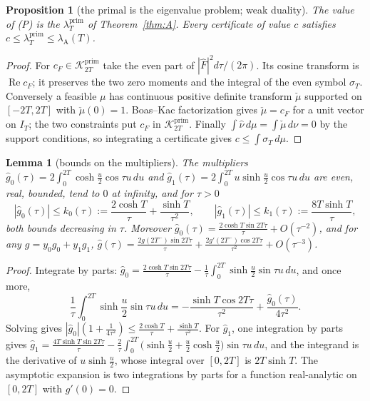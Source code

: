 \documentclass[10pt]{amsart}
\newtheorem{proposition}[theorem]{Proposition}
\newtheorem{lemma}[theorem]{Lemma}
\theoremstyle{definition}
\theoremstyle{remark}
\newcommand{\Rel}{\operatorname{Re}}
\newcommand{\Kp}{\mathcal K^{\mathrm{prim}}_{2T}}
\newcommand{\IT}{I_T}
\newcommand{\lamP}{\lambda^{\mathrm{prim}}_T}
\newcommand{\lamA}{\lambda_{\mathrm A}(T)}
\newcommand{\sT}{\sigma_T}
\newcommand{\gh}[1]{\widehat g_{#1}}
\newcommand{\nuh}{\widehat\nu}
\newcommand{\Fh}{\widehat F}
\newcommand{\cF}{c_F}
\begin{document}
\begin{proposition}[the primal is the eigenvalue problem; weak duality]\label{prop:weak}
The value of \textup{(P)} is the $\lamP$ of Theorem~\ref{thm:A}. Every certificate of value $c$
satisfies $c\le\lamP\le\lamA$.
\end{proposition}
\begin{proof}
For $\cF\in\Kp$ take the even part of $|\Fh|^2d\tau/(2\pi)$.
Its cosine transform is $\Rel\cF$; it preserves the two zero moments
and the integral of the even symbol $\sT$. Conversely a feasible
$\mu$ has continuous positive definite transform $\check\mu$ supported
on $[-2T,2T]$ with $\check\mu(0)=1$. Boas--Kac factorization
\cite{BoasKac1945} gives $\check\mu=\cF$ for a unit vector on $\IT$;
the two constraints put $\cF$ in $\Kp$. Finally
$\int\nuh\,d\mu=\int\check\mu\,d\nu=0$ by the support conditions,
so integrating a certificate gives $c\le\int\sT\,d\mu$.
\end{proof}

\begin{lemma}[bounds on the multipliers]\label{lem:gbounds}
The multipliers $\gh0(\tau)=2\int_0^{2T}\cosh\frac u2\cos\tau u\,du$ and $\gh1(\tau)=2\int_0^{2T}u\sinh\frac u2\cos\tau u\,du$
are even, real, bounded, tend to $0$ at infinity, and for $\tau>0$
\[
|\gh0(\tau)|\le k_0(\tau):=\frac{2\cosh T}{\tau}+\frac{\sinh T}{\tau^2},\qquad
|\gh1(\tau)|\le k_1(\tau):=\frac{8T\sinh T}{\tau},
\]
both bounds decreasing in $\tau$. Moreover $\gh0(\tau)=\frac{2\cosh T\sin2T\tau}{\tau}+O(\tau^{-2})$,
and for any $g=y_0g_0+y_1g_1$, $\widehat g(\tau)=\frac{2g(2T^-)\sin2T\tau}{\tau}+\frac{2g'(2T^-)\cos2T\tau}{\tau^2}+O(\tau^{-3})$.
\end{lemma}
\begin{proof}
Integrate by parts: $\gh0=\frac{2\cosh T\sin2T\tau}\tau-\frac1\tau\int_0^{2T}\sinh\frac u2\sin\tau u\,du$,
and once more,
\[\frac1\tau\int_0^{2T}\sinh\frac u2\sin\tau u\,du=-\frac{\sinh T\cos2T\tau}{\tau^2}+\frac{\gh0(\tau)}{4\tau^2}.\]
Solving gives $|\gh0|(1+\frac1{4\tau^2})\le\frac{2\cosh T}\tau+\frac{\sinh T}{\tau^2}$. For $\gh1$, one
integration by parts gives $\gh1=\frac{4T\sinh T\sin2T\tau}{\tau}-\frac2\tau\int_0^{2T}\big(\sinh\frac u2+\frac u2\cosh\frac u2\big)\sin\tau u\,du$,
and the integrand is the derivative of $u\sinh\frac u2$, whose integral over $[0,2T]$ is $2T\sinh T$.
The asymptotic expansion is two integrations by parts for a function real-analytic on $[0,2T]$
with $g'(0)=0$.
\end{proof}
\end{document}

